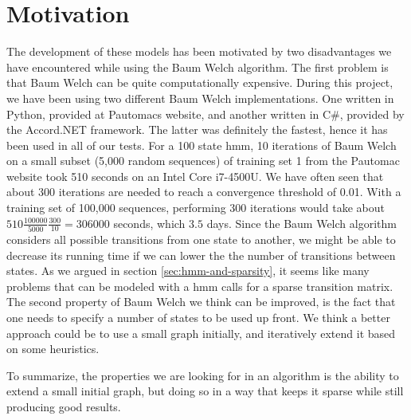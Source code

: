 \section{Motivation}
The development of these models has been motivated by two disadvantages we have encountered while using the Baum Welch algorithm.
The first problem is that Baum Welch can be quite computationally expensive.
During this project, we have been using two different Baum Welch implementations. One written in Python, provided at Pautomacs website, and another written in C\#, provided by the Accord.NET framework. The latter was definitely the fastest, hence it has been used in all of our tests.
For a 100 state \gls{hmm}, 10 iterations of Baum Welch on a small subset (5,000 random sequences) of training set 1 from the Pautomac website took 510 seconds on an Intel Core i7-4500U. We have often seen that about 300 iterations are needed to reach a convergence threshold of 0.01. With a training set of 100,000 sequences, performing 300 iterations would take about $510\frac{100000}{5000}\frac{300}{10} = 306000$ seconds, which $3.5$ days.
Since the Baum Welch algorithm considers all possible transitions from one state to another, we might be able to decrease its running time if we can lower the the number of transitions between states. As we argued in section \ref{sec:hmm-and-sparsity}, it seems like many problems that can be modeled with a \gls{hmm} calls for a sparse transition matrix.
The second property of Baum Welch we think can be improved, is the fact that one needs to specify a number of states to be used up front.
We think a better approach could be to use a small graph initially, and iteratively extend it based on some heuristics.

To summarize, the properties we are looking for in an algorithm is the ability to extend a small initial graph, but doing so in a way that keeps it sparse while still producing good results.